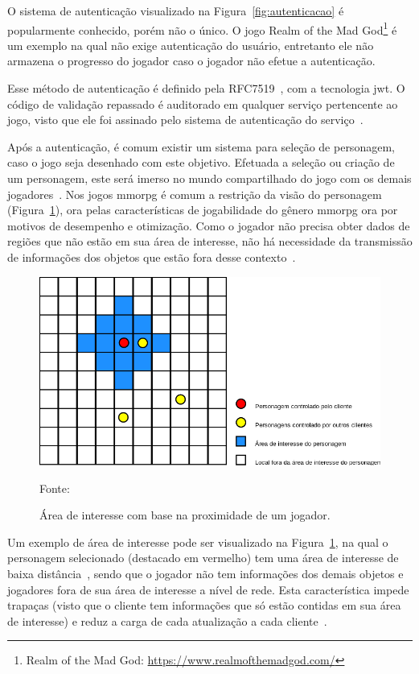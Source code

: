 O sistema de autenticação visualizado na Figura~\ref{fig:autenticacao} é popularmente conhecido, porém não o único.
%
O jogo Realm of the Mad God\footnote{Realm of the Mad God: \url{https://www.realmofthemadgod.com/}} é um exemplo na qual não exige autenticação do usuário, entretanto ele não armazena o progresso do jogador caso o jogador não efetue a autenticação.


Esse método de autenticação é definido pela RFC7519~\cite{rfc7519}, com a tecnologia \ac{jwt}.
%
O código de validação repassado é auditorado em qualquer serviço pertencente ao jogo, visto que ele foi assinado pelo sistema de autenticação do serviço~\cite{Ikem2018May}.


Após a autenticação, é comum existir um sistema para seleção de personagem, caso o jogo seja desenhado com este objetivo.
%
Efetuada a seleção ou criação de um personagem, este será imerso no mundo compartilhado do jogo com os demais jogadores~\cite{matthiasrudy2011}.
%
Nos jogos \ac{mmorpg} é comum a restrição da visão do personagem (Figura~\ref{fig:proximidade}), ora pelas características de jogabilidade do gênero \ac{mmorpg} ora por motivos de desempenho e otimização.
%
Como o jogador não precisa obter dados de regiões que não estão em sua área de interesse, não há necessidade da transmissão de informações dos objetos que estão fora desse contexto~\cite{albion_online_unite}.

\begin{figure}[htb!]
\caption{Área de interesse com base na proximidade de um jogador.}
\label{fig:proximidade}
\includegraphics[width=\textwidth]{img/cap2/proximidade.png}
\centering

Fonte:~\cite{albion_online_unite}
\end{figure}


Um exemplo de área de interesse pode ser visualizado na Figura~\ref{fig:proximidade}, na qual o personagem selecionado (destacado em vermelho) tem uma área de interesse de baixa distância~\cite{albion_online_unite}, sendo que o jogador não tem informações dos demais objetos e jogadores fora de sua área de interesse a nível de rede.
%
Esta característica impede trapaças (visto que o cliente tem informações que só estão contidas em sua área de interesse) e reduz a carga de cada atualização a cada cliente~\cite{albion_online_unite}.


